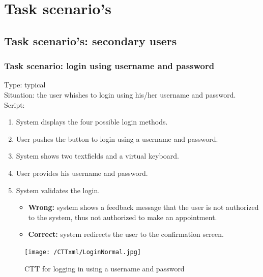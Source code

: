 \documentclass[11pt, a4paper,svglistings]{report}
\begin{document}


\chapter{Task scenario's}

\section{Task scenario's: secondary users}

\subsection{\label{subsec:loginPass}Task scenario: login using username and password}

Type: typical \\
Situation: the user whishes to login using his/her username and password. \\
Script:
\begin{enumerate}
\item System displays the four possible login methods.
\item User pushes the button to login using a username and password.
\item System shows two textfields and a virtual keyboard.
\item User provides his username and password.
\item System validates the login.
\begin{itemize}
\item \textbf{Wrong:} system shows a feedback message that the user is not authorized to the system, thus not authorized to make an appointment.
\item \textbf{Correct:} system redirects the user to the  confirmation screen.
\end{itemize}
\end{enumerate}

\begin{figure}[H]
\centering
    \texttt{[image: /CTTxml/LoginNormal.jpg]}
  \caption[Username / password login CTT]{CTT for logging in using a username and password}
\end{figure}
\end{document}
